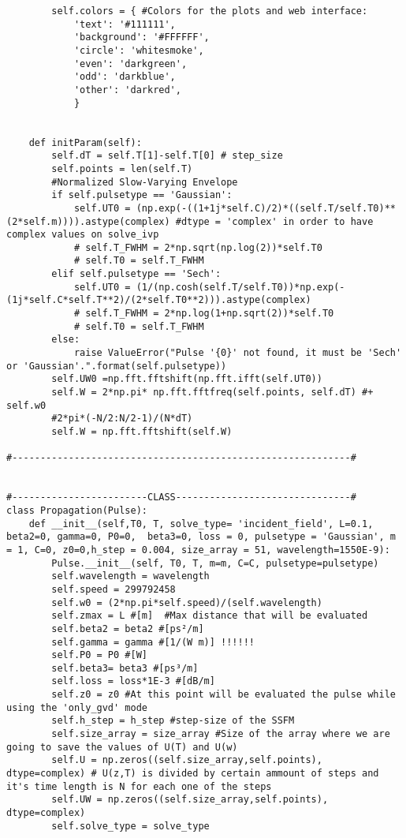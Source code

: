 \begin{verbatim}
        self.colors = { #Colors for the plots and web interface:
            'text': '#111111',
            'background': '#FFFFFF',
            'circle': 'whitesmoke',
            'even': 'darkgreen',
            'odd': 'darkblue',
            'other': 'darkred',
            }


    def initParam(self):
        self.dT = self.T[1]-self.T[0] # step_size
        self.points = len(self.T)
        #Normalized Slow-Varying Envelope
        if self.pulsetype == 'Gaussian':
            self.UT0 = (np.exp(-((1+1j*self.C)/2)*((self.T/self.T0)**(2*self.m)))).astype(complex) #dtype = 'complex' in order to have complex values on solve_ivp 
            # self.T_FWHM = 2*np.sqrt(np.log(2))*self.T0
            # self.T0 = self.T_FWHM
        elif self.pulsetype == 'Sech':
            self.UT0 = (1/(np.cosh(self.T/self.T0))*np.exp(-(1j*self.C*self.T**2)/(2*self.T0**2))).astype(complex)
            # self.T_FWHM = 2*np.log(1+np.sqrt(2))*self.T0
            # self.T0 = self.T_FWHM
        else:
            raise ValueError("Pulse '{0}' not found, it must be 'Sech' or 'Gaussian'.".format(self.pulsetype))
        self.UW0 =np.fft.fftshift(np.fft.ifft(self.UT0))
        self.W = 2*np.pi* np.fft.fftfreq(self.points, self.dT) #+ self.w0
        #2*pi*(-N/2:N/2-1)/(N*dT)
        self.W = np.fft.fftshift(self.W) 

#------------------------------------------------------------#


#------------------------CLASS-------------------------------#
class Propagation(Pulse):
    def __init__(self,T0, T, solve_type= 'incident_field', L=0.1, beta2=0, gamma=0, P0=0,  beta3=0, loss = 0, pulsetype = 'Gaussian', m = 1, C=0, z0=0,h_step = 0.004, size_array = 51, wavelength=1550E-9):
        Pulse.__init__(self, T0, T, m=m, C=C, pulsetype=pulsetype)
        self.wavelength = wavelength
        self.speed = 299792458
        self.w0 = (2*np.pi*self.speed)/(self.wavelength)
        self.zmax = L #[m]  #Max distance that will be evaluated
        self.beta2 = beta2 #[ps²/m]
        self.gamma = gamma #[1/(W m)] !!!!!! 
        self.P0 = P0 #[W]
        self.beta3= beta3 #[ps³/m]
        self.loss = loss*1E-3 #[dB/m]
        self.z0 = z0 #At this point will be evaluated the pulse while using the 'only_gvd' mode
        self.h_step = h_step #step-size of the SSFM
        self.size_array = size_array #Size of the array where we are going to save the values of U(T) and U(w)
        self.U = np.zeros((self.size_array,self.points), dtype=complex) # U(z,T) is divided by certain ammount of steps and it's time length is N for each one of the steps
        self.UW = np.zeros((self.size_array,self.points), dtype=complex)
        self.solve_type = solve_type


\end{verbatim}
